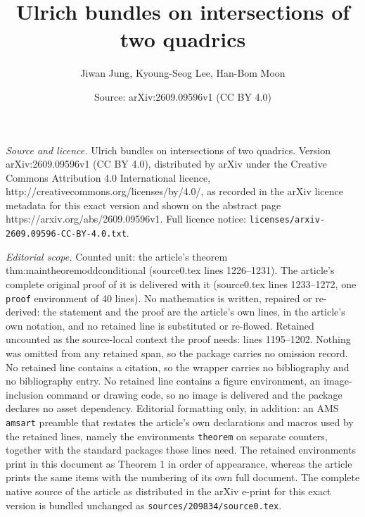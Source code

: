 \documentclass[10pt,a4paper]{amsart}
\title{Ulrich bundles on intersections of two quadrics}
\author{Jiwan Jung, Kyoung-Seog Lee, Han-Bom Moon}
\date{Source: arXiv:2609.09596v1 (CC BY 4.0)}
\begin{document}
\maketitle

\noindent\emph{Source and licence.} Ulrich bundles on intersections of two quadrics. Version arXiv:2609.09596v1 (CC BY 4.0), distributed by arXiv under the Creative Commons Attribution 4.0 International licence, http://creativecommons.org/licenses/by/4.0/, as recorded in the arXiv licence metadata for this exact version and shown on the abstract page https://arxiv.org/abs/2609.09596v1. Full licence notice: \texttt{licenses/arxiv-2609.09596-CC-BY-4.0.txt}.\par\smallskip

\noindent\textit{Editorial scope.} Counted unit: the article's theorem thm:maintheoremoddconditional (source0.tex lines 1226--1231). The article's complete original proof of it is delivered with it (source0.tex lines 1233--1272, one \texttt{proof} environment of 40 lines). No mathematics is written, repaired or re-derived: the statement and the proof are the article's own lines, in the article's own notation, and no retained line is substituted or re-flowed.  Retained uncounted as the source-local context the proof needs: lines 1195--1202.  Nothing was omitted from any retained span, so the package carries no omission record.  No retained line contains a citation, so the wrapper carries no bibliography and no bibliography entry.  No retained line contains a figure environment, an image-inclusion command or drawing code, so no image is delivered and the package declares no asset dependency.  Editorial formatting only, in addition: an AMS \texttt{amsart} preamble that restates the article's own declarations and macros used by the retained lines, namely the environments \texttt{theorem} on separate counters, together with the standard packages those lines need.  The retained environments print in this document as Theorem 1 in order of appearance, whereas the article prints the same items with the numbering of its own full document.  The complete native source of the article as distributed in the arXiv e-print for this exact version is bundled unchanged as \texttt{sources/209834/source0.tex}.
\end{document}
